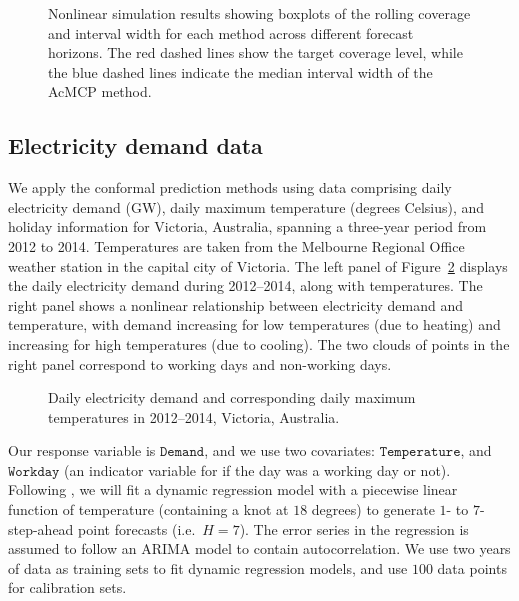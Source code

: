 \documentclass[
  11pt,
  12pt]{article}
\theoremstyle{plain}
\theoremstyle{remark}
\begin{document}
\begin{figure}


\caption{\label{fig-NL_box}Nonlinear simulation results showing boxplots
of the rolling coverage and interval width for each method across
different forecast horizons. The red dashed lines show the target
coverage level, while the blue dashed lines indicate the median interval
width of the AcMCP method.}

\end{figure}%

\subsection{Electricity demand data}\label{electricity-demand-data}

We apply the conformal prediction methods using data comprising daily
electricity demand (GW), daily maximum temperature (degrees Celsius),
and holiday information for Victoria, Australia, spanning a three-year
period from 2012 to 2014. Temperatures are taken from the Melbourne
Regional Office weather station in the capital city of Victoria. The
left panel of Figure~\ref{fig-elec_data} displays the daily electricity
demand during 2012--2014, along with temperatures. The right panel shows
a nonlinear relationship between electricity demand and temperature,
with demand increasing for low temperatures (due to heating) and
increasing for high temperatures (due to cooling). The two clouds of
points in the right panel correspond to working days and non-working
days.

\begin{figure}[!b]


\caption{\label{fig-elec_data}Daily electricity demand and corresponding
daily maximum temperatures in 2012--2014, Victoria, Australia.}

\end{figure}%

Our response variable is \(\texttt{Demand}\), and we use two covariates:
\(\texttt{Temperature}\), and \(\texttt{Workday}\) (an indicator
variable for if the day was a working day or not). Following
\citet{hyndman2021}, we will fit a dynamic regression model with a
piecewise linear function of temperature (containing a knot at \(18\)
degrees) to generate \(1\)- to \(7\)-step-ahead point forecasts
(i.e.~\(H=7\)). The error series in the regression is assumed to follow
an ARIMA model to contain autocorrelation. We use two years of data as
training sets to fit dynamic regression models, and use \(100\) data
points for calibration sets.
\end{document}
